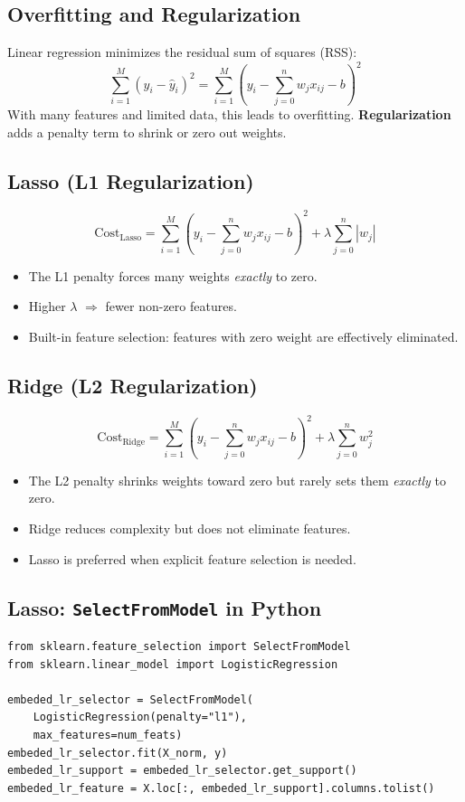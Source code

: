 \documentclass[11pt]{article}
\begin{document}
\subsection{Overfitting and Regularization}
Linear regression minimizes the residual sum of squares (RSS):
\[
\sum_{i=1}^{M} (y_i - \hat{y}_i)^2 =
\sum_{i=1}^{M}\!\left(y_i - \sum_{j=0}^{n} w_j x_{ij} - b\right)^{\!2}
\]
With many features and limited data, this leads to overfitting.
\textbf{Regularization} adds a penalty term to shrink or zero out
weights.

\subsection{Lasso (L1 Regularization)}
\[
\text{Cost}_{\text{Lasso}} =
\sum_{i=1}^{M}\!\left(y_i - \sum_{j=0}^{n} w_j x_{ij} - b\right)^{\!2}
+ \lambda \sum_{j=0}^{n} |w_j|
\]
\begin{itemize}
    \item The L1 penalty forces many weights \emph{exactly} to zero.
    \item Higher $\lambda$ $\Rightarrow$ fewer non-zero features.
    \item Built-in feature selection: features with zero weight
      are effectively eliminated.
\end{itemize}

\subsection{Ridge (L2 Regularization)}
\[
\text{Cost}_{\text{Ridge}} =
\sum_{i=1}^{M}\!\left(y_i - \sum_{j=0}^{n} w_j x_{ij} - b\right)^{\!2}
+ \lambda \sum_{j=0}^{n} w_j^2
\]
\begin{itemize}
    \item The L2 penalty shrinks weights toward zero but rarely
      sets them \emph{exactly} to zero.
    \item Ridge reduces complexity but does not eliminate features.
    \item Lasso is preferred when explicit feature selection is needed.
\end{itemize}

\subsection{Lasso: \texttt{SelectFromModel} in Python}
\begin{verbatim}
from sklearn.feature_selection import SelectFromModel
from sklearn.linear_model import LogisticRegression

embeded_lr_selector = SelectFromModel(
    LogisticRegression(penalty="l1"),
    max_features=num_feats)
embeded_lr_selector.fit(X_norm, y)
embeded_lr_support = embeded_lr_selector.get_support()
embeded_lr_feature = X.loc[:, embeded_lr_support].columns.tolist()
\end{verbatim}
\end{document}

